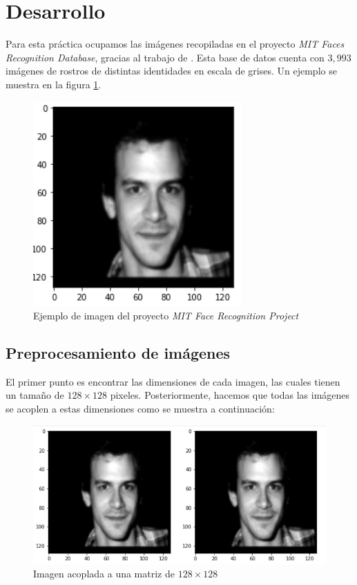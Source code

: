 \documentclass[conference]{IEEEtran}
\begin{document}
\section{Desarrollo}

Para esta práctica ocupamos las imágenes recopiladas en el proyecto \textit{MIT Faces Recognition Database}, gracias al trabajo de \cite{szummer}. Esta base de datos cuenta con $3,993$ imágenes de rostros de distintas identidades en escala de grises. Un ejemplo se muestra en la figura \ref{fig:face_1000}.

\begin{figure}[H]
    \centering
    \includegraphics[scale=0.3]{imgs/face_1000.png}
    \caption{Ejemplo de imagen del proyecto \textit{MIT Face Recognition Project}}
    \label{fig:face_1000}
\end{figure}

\subsection{Preprocesamiento de imágenes}
El primer punto es encontrar las dimensiones de cada imagen, las cuales tienen un tamaño de $128\times 128$ pixeles. Posteriormente, hacemos que todas las imágenes se acoplen a estas dimensiones como se muestra a continuación: 

\begin{figure}[H]
    \centering
    \includegraphics[scale=0.2]{imgs/centered_images.png}
    \caption{Imagen acoplada a una matriz de $128\times 128$}
    \label{fig:faces_centered}
\end{figure}
\end{document}
